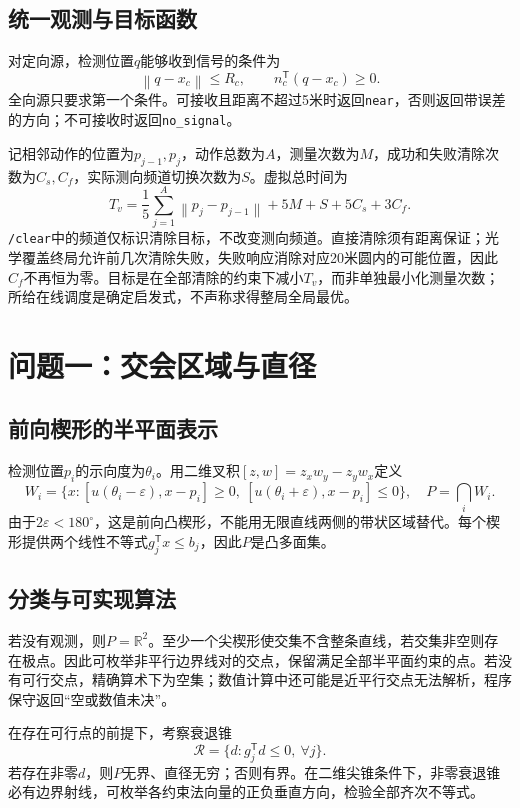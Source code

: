 \documentclass[UTF8,a4paper,zihao=-4,fontset=windows]{ctexart}
\newcommand{\norm}[1]{\left\lVert#1\right\rVert}
\newcommand{\R}{\mathbb R}
\begin{document}
\subsection{统一观测与目标函数}
对定向源，检测位置$q$能够收到信号的条件为
\begin{equation}
\norm{q-x_c}\le R_c,\qquad n_c^\mathsf T(q-x_c)\ge0.
\end{equation}
全向源只要求第一个条件。可接收且距离不超过5米时返回\texttt{near}，否则返回带误差的方向；不可接收时返回\texttt{no\_signal}。

记相邻动作的位置为$p_{j-1},p_j$，动作总数为$A$，测量次数为$M$，成功和失败清除次数为$C_s,C_f$，实际测向频道切换次数为$S$。虚拟总时间为
\begin{equation}\label{eq:cost}
T_v=\frac15\sum_{j=1}^{A}\norm{p_j-p_{j-1}}+5M+S+5C_s+3C_f.
\end{equation}
\texttt{/clear}中的频道仅标识清除目标，不改变测向频道。直接清除须有距离保证；光学覆盖终局允许前几次清除失败，失败响应消除对应20米圆内的可能位置，因此$C_f$不再恒为零。目标是在全部清除的约束下减小$T_v$，而非单独最小化测量次数；所给在线调度是确定启发式，不声称求得整局全局最优。

\section{问题一：交会区域与直径}
\subsection{前向楔形的半平面表示}
检测位置$p_i$的示向度为$\theta_i$。用二维叉积$[z,w]=z_xw_y-z_yw_x$定义
\begin{equation}
W_i=\{x:[u(\theta_i-\varepsilon),x-p_i]\ge0,
\ [u(\theta_i+\varepsilon),x-p_i]\le0\},\quad P=\bigcap_iW_i.
\end{equation}
由于$2\varepsilon<180^\circ$，这是前向凸楔形，不能用无限直线两侧的带状区域替代。每个楔形提供两个线性不等式$g_j^\mathsf Tx\le b_j$，因此$P$是凸多面集。

\subsection{分类与可实现算法}
若没有观测，则$P=\R^2$。至少一个尖楔形使交集不含整条直线，若交集非空则存在极点。因此可枚举非平行边界线对的交点，保留满足全部半平面约束的点。若没有可行交点，精确算术下为空集；数值计算中还可能是近平行交点无法解析，程序保守返回“空或数值未决”。

在存在可行点的前提下，考察衰退锥
\begin{equation}
\mathcal R=\{d:g_j^\mathsf Td\le0,\ \forall j\}.
\end{equation}
若存在非零$d$，则$P$无界、直径无穷；否则有界。在二维尖锥条件下，非零衰退锥必有边界射线，可枚举各约束法向量的正负垂直方向，检验全部齐次不等式。
\end{document}
